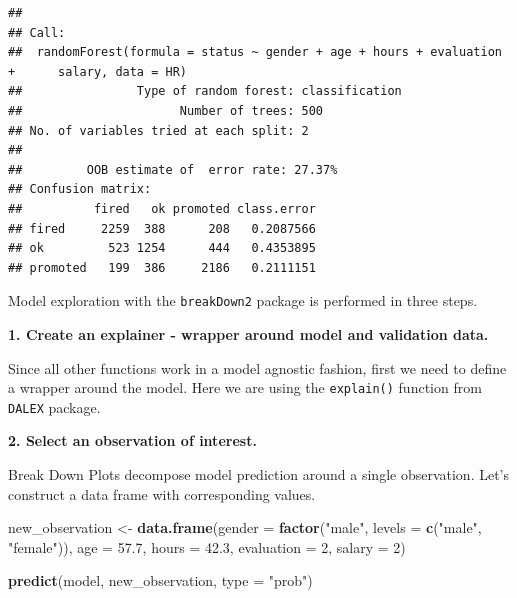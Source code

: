 \documentclass[12pt,]{krantz}
\newenvironment{Shaded}{\begin{snugshade}}{\end{snugshade}}
\newcommand{\DataTypeTok}[1]{\textcolor[rgb]{0.13,0.29,0.53}{#1}}
\newcommand{\DecValTok}[1]{\textcolor[rgb]{0.00,0.00,0.81}{#1}}
\newcommand{\FloatTok}[1]{\textcolor[rgb]{0.00,0.00,0.81}{#1}}
\newcommand{\KeywordTok}[1]{\textcolor[rgb]{0.13,0.29,0.53}{\textbf{#1}}}
\newcommand{\NormalTok}[1]{#1}
\newcommand{\OperatorTok}[1]{\textcolor[rgb]{0.81,0.36,0.00}{\textbf{#1}}}
\newcommand{\StringTok}[1]{\textcolor[rgb]{0.31,0.60,0.02}{#1}}
\theoremstyle{definition}
\theoremstyle{definition}
\theoremstyle{definition}
\theoremstyle{remark}
\begin{document}
\begin{verbatim}
## 
## Call:
##  randomForest(formula = status ~ gender + age + hours + evaluation +      salary, data = HR) 
##                Type of random forest: classification
##                      Number of trees: 500
## No. of variables tried at each split: 2
## 
##         OOB estimate of  error rate: 27.37%
## Confusion matrix:
##          fired   ok promoted class.error
## fired     2259  388      208   0.2087566
## ok         523 1254      444   0.4353895
## promoted   199  386     2186   0.2111151
\end{verbatim}

Model exploration with the \texttt{breakDown2} package is performed in
three steps.

\textbf{1. Create an explainer - wrapper around model and validation
data.}

Since all other functions work in a model agnostic fashion, first we
need to define a wrapper around the model. Here we are using the
\texttt{explain()} function from \texttt{DALEX} package.

\begin{Shaded}
\end{Shaded}

\textbf{2. Select an observation of interest.}

Break Down Plots decompose model prediction around a single observation.
Let's construct a data frame with corresponding values.

\begin{Shaded}
\begin{Highlighting}[]
\NormalTok{new_observation <-}\StringTok{ }\KeywordTok{data.frame}\NormalTok{(}\DataTypeTok{gender =} \KeywordTok{factor}\NormalTok{(}\StringTok{"male"}\NormalTok{, }\DataTypeTok{levels =} \KeywordTok{c}\NormalTok{(}\StringTok{"male"}\NormalTok{, }\StringTok{"female"}\NormalTok{)),}
                      \DataTypeTok{age =} \FloatTok{57.7}\NormalTok{,}
                      \DataTypeTok{hours =} \FloatTok{42.3}\NormalTok{,}
                      \DataTypeTok{evaluation =} \DecValTok{2}\NormalTok{,}
                      \DataTypeTok{salary =} \DecValTok{2}\NormalTok{)}

\KeywordTok{predict}\NormalTok{(model, new_observation, }\DataTypeTok{type =} \StringTok{"prob"}\NormalTok{)}
\end{Highlighting}
\end{Shaded}
\end{document}
